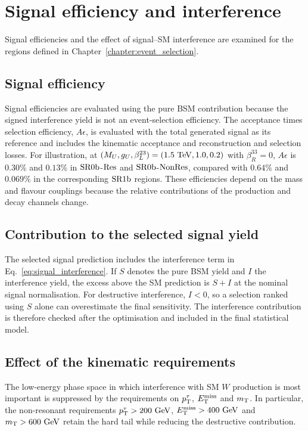 \chapter{Signal efficiency and interference}
\label{app:signal_interference_study}

Signal efficiencies and the effect of signal--SM interference are examined for the regions defined in Chapter~\ref{chapter:event_selection}.

\section{Signal efficiency}
\label{app:signal_efficiency}

Signal efficiencies are evaluated using the pure BSM contribution because the signed interference yield is not an event-selection efficiency.
The acceptance times selection efficiency, $A\epsilon$, is evaluated with the total generated signal as its reference and includes the kinematic acceptance and reconstruction and selection losses.
For illustration, at $(M_U,g_U,\beta_L^{23})=(1.5~\mathrm{TeV},1.0,0.2)$ with $\beta_R^{33}=0$, $A\epsilon$ is $0.30\%$ and $0.13\%$ in $\mathrm{SR0b}$-$\mathrm{Res}$ and $\mathrm{SR0b}$-$\mathrm{NonRes}$, compared with $0.64\%$ and $0.069\%$ in the corresponding $\mathrm{SR1b}$ regions.
These efficiencies depend on the mass and flavour couplings because the relative contributions of the production and decay channels change.

\section{Contribution to the selected signal yield}

The selected signal prediction includes the interference term in Eq.~\ref{eq:signal_interference}.
If $S$ denotes the pure BSM yield and $I$ the interference yield, the excess above the SM prediction is $S+I$ at the nominal signal normalisation.
For destructive interference, $I<0$, so a selection ranked using $S$ alone can overestimate the final sensitivity.
The interference contribution is therefore checked after the optimisation and included in the final statistical model.

\section{Effect of the kinematic requirements}

The low-energy phase space in which interference with SM $W$ production is most important is suppressed by the requirements on $p_{\mathrm{T}}^\tau$, $E_{\mathrm{T}}^{\mathrm{miss}}$ and $m_{\mathrm{T}}$.
In particular, the non-resonant requirements $p_{\mathrm{T}}^\tau>200~\mathrm{GeV}$, $E_{\mathrm{T}}^{\mathrm{miss}}>400~\mathrm{GeV}$ and $m_{\mathrm{T}}>600~\mathrm{GeV}$ retain the hard tail while reducing the destructive contribution.

